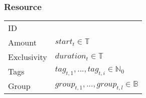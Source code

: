 \subsubsection{Resource}
\begin{tabular}{|p{3.5cm}||p{4.75cm}|}
\hline
    ID                	&  \\
    Amount		        & $start_t\in\mathbb{T}$ \\
    Exclusivity			& $duration_t\in\mathbb{T}$ \\
    Tags                & $tag_{t,1},...,tag_{t,i}\in\mathbb{N}_0$ \\
    Group				& $group_{t,1},...,group_{t,l}\in\mathbb{B}$ \\
\hline
\end{tabular}